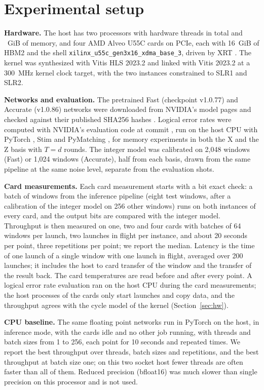 \section{Experimental setup}\label{sec:setup}

\textbf{Hardware.} The host has two \NumHostCpu{} processors with \NumHostThreads{} hardware threads in total and
\NumHostMemGiB{}~GiB of memory, and four AMD Alveo U55C cards \cite{amd_ds978} on PCIe, each with 16~GiB of HBM2 and the
shell \texttt{xilinx\_u55c\_gen3x16\_xdma\_base\_3}, driven by XRT \NumXrtVersion{} \cite{amd_xrt}. The kernel was
synthesized with Vitis HLS 2023.2 and linked with Vitis 2023.2 at a 300~MHz kernel clock target, with the two instances
constrained to SLR1 and SLR2.

\textbf{Networks and evaluation.} The pretrained Fast (checkpoint v1.0.77) and Accurate (v1.0.86) networks were
downloaded from NVIDIA's model pages and checked against their published SHA256 hashes \cite{nvidia_fast_card,
nvidia_accurate_card}. Logical error rates were computed with NVIDIA's evaluation code at commit \NumNvidiaCommit{}
\cite{nvidia_ising_code}, run on the host CPU with PyTorch \NumTorchVersion{}, Stim \NumStimVersion{}
\cite{gidney2021stim} and PyMatching \NumPymatchingVersion{} \cite{higgott2025sparse}, for memory experiments in both
the X and the Z basis with $T=d$ rounds. The integer model was calibrated on 2{,}048 windows (Fast) or 1{,}024 windows
(Accurate), half from each basis, drawn from the same pipeline at the same noise level, separate from the
evaluation shots.

\textbf{Card measurements.} Each card measurement starts with a bit exact check: a batch of windows from the
inference pipeline (eight test windows, after a calibration of the integer model on 256 other windows) runs on both
instances of every card, and the output bits are compared with the integer model.
Throughput is then measured on one, two and four cards with batches of 64 windows per launch, two launches in flight
per instance, and about 20 seconds per point, three repetitions per point; we report the median. Latency is the time
of one launch of a single window with one launch in flight, averaged over 200 launches; it includes the host to card
transfer of the window and the transfer of the result back. The card temperatures are read before and after every
point. A logical error rate evaluation ran on the host CPU during the card measurements; the host
processes of the cards only start launches and copy data, and the throughput agrees with the cycle model of the
kernel (Section~\ref{sec:hw}).

\textbf{CPU baseline.} The same floating point networks run in PyTorch \NumTorchVersion{} on the host, in inference
mode, with the cards idle and no other job running, with \NumCpuThreadList{} threads and batch sizes from 1 to 256,
each point for 10 seconds and repeated \NumCpuReps{} times. We report the best throughput over threads, batch sizes
and repetitions, and the best throughput at batch size one; on this two socket host fewer threads are often faster
than all of them. Reduced precision (bfloat16) was much slower than single precision on this processor and is not
used.
